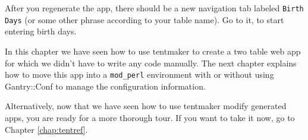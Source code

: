 After you regenerate the app, there should be a new navigation tab
labeled \verb+Birth Days+ (or some other phrase according to your table name).
Go to it, to start entering birth days.

In this chapter we have seen how to use tentmaker to create a two table
web app for which we didn't have to write any code manually.  The next
chapter explains how to move this app into a \verb+mod_perl+ environment
with or without using Gantry::Conf to manage the configuration information.

Alternatively, now that we have seen how to use tentmaker modify generated
apps, you are ready for a more thorough tour.  If you want to take it now,
go to Chapter \ref{chap:tentref}.
